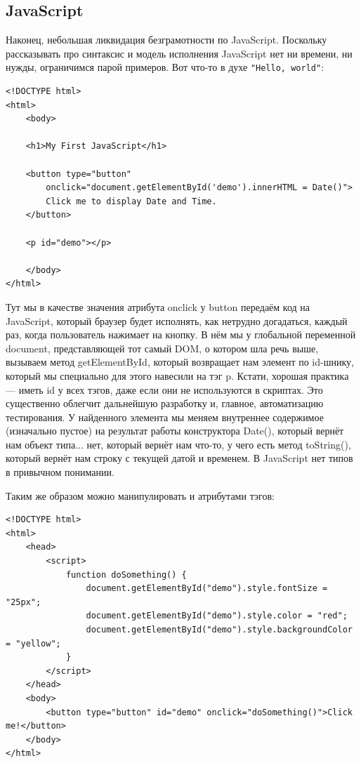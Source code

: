\documentclass[a5paper]{article}
\begin{document}
\subsection{JavaScript}

Наконец, небольшая ликвидация безграмотности по JavaScript. Поскольку рассказывать про синтаксис и модель исполнения JavaScript нет ни времени, ни нужды, ограничимся парой примеров. Вот что-то в духе \texttt{"Hello, world"}:

\begin{verbatim}
<!DOCTYPE html>
<html>
    <body>

    <h1>My First JavaScript</h1>

    <button type="button"
        onclick="document.getElementById('demo').innerHTML = Date()">
        Click me to display Date and Time.
    </button>

    <p id="demo"></p>

    </body>
</html> 
\end{verbatim}

Тут мы в качестве значения атрибута onclick у button передаём код на JavaScript, который браузер будет исполнять, как нетрудно догадаться, каждый раз, когда пользователь нажимает на кнопку. В нём мы у глобальной переменной document, представляющей тот самый DOM, о котором шла речь выше, вызываем метод getElementById, который возвращает нам элемент по id-шнику, который мы специально для этого навесили на тэг p. Кстати, хорошая практика --- иметь id у всех тэгов, даже если они не используются в скриптах. Это существенно облегчит дальнейшую разработку и, главное, автоматизацию тестирования. У найденного элемента мы меняем внутреннее содержимое (изначально пустое) на результат работы конструктора Date(), который вернёт нам объект типа... нет, который вернёт нам что-то, у чего есть метод toString(), который вернёт нам строку с текущей датой и временем. В JavaScript нет типов в привычном понимании.

Таким же образом можно манипулировать и атрибутами тэгов:

\begin{verbatim}
<!DOCTYPE html>
<html>
    <head>
        <script>
            function doSomething() {
                document.getElementById("demo").style.fontSize = "25px";
                document.getElementById("demo").style.color = "red";
                document.getElementById("demo").style.backgroundColor = "yellow";
            }
        </script>
    </head>
    <body>
        <button type="button" id="demo" onclick="doSomething()">Click me!</button>
    </body>
</html>
\end{verbatim}
\end{document}
